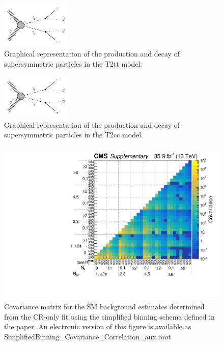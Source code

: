 \begin{figure}[h!] \begin{center}
    \includegraphics[width=0.3\textwidth]{Supplementary/T2tt_feyn_aux}
        \caption{
            Graphical representation of the production and decay of
            supersymmetric particles in the T2tt model.
        }
        \label{fig:simplified-models-feyn-T2tt}
\end{center} \end{figure}

\begin{figure}[h!] \begin{center}
    \includegraphics[width=0.3\textwidth]{Supplementary/T2cc_feyn_aux}
        \caption{
            Graphical representation of the production and decay of
            supersymmetric particles in the T2cc model.
        }
        \label{fig:simplified-models-feyn-T2cc}
\end{center} \end{figure}

\clearpage
\begin{figure}
  \centering
  \includegraphics[width=\textwidth]{Supplementary/SimplifiedBinning_Covariance_aux}
  \caption{Covariance matrix for the SM background estimates
    determined from the CR-only fit using the simplified binning
	schema defined in the paper.
	An electronic version of this figure is available as SimplifiedBinning\_Covariance\_Correlation\_aux.root
	} %
  \label{fig:covariance_aux}
\end{figure} 
\clearpage

